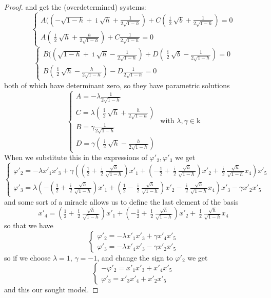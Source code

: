 \documentclass[10pt,reqno]{amsart}
\newcommand{\ii}{\operatorname{i}}
\newcommand{\g}{\gamma}
\newcommand{\f}{\varphi}
\renewcommand{\l}{\lambda}
\newcommand{\kk}{\mathrm{k}}
\theoremstyle{definition}
\begin{document}
\begin{proof}
 and get the (overdetermined) systems:
\[
\begin{cases}
    A((-\sqrt{1-h} + \ii \sqrt{h} + \tfrac{1}{2 \sqrt{1-h}})+ C ( \tfrac{\ii}{2} \sqrt{b} + \tfrac{1}{2 \sqrt{1-h}}) =0 \\
    A (\tfrac{\ii}{2} \sqrt{h} + \tfrac{h}{2 \sqrt{1-h}}) + C \tfrac{1}{2 \sqrt{1-h}} = 0
\end{cases}
\]
\[
\begin{cases}
    B((\sqrt{1-h} + \ii \sqrt{h} - \tfrac{1}{2 \sqrt{1-h}})+ D (\tfrac{\ii}{2} \sqrt{b} - \tfrac{1}{2 \sqrt{1-h}}) =0 \\
    B (\tfrac{\ii}{2} \sqrt{h} - \tfrac{h}{2 \sqrt{1-h}}) - D \tfrac{1}{2 \sqrt{1-h}} = 0
\end{cases}
\]
both of which have determinant zero, so they have parametric solutions
\[
\begin{cases}
    A=-\l \frac{1}{2\sqrt{1-h}}  \\
    C= \l (\frac{\ii}{2} \sqrt{h} +\frac{h}
    {2 \sqrt{1-h}}) \\
    B= \g \frac{1}{2 \sqrt{1-h}} \\
    D= \g (\frac{\ii}{2} \sqrt{h} - \frac{h}{2 \sqrt{1-h}})
\end{cases}
\text{ with } \l , \g \in \kk
\]
When we substitute this in the expressions of $\f'_2, \f'_3$ we get
\[
\begin{cases}
    \f'_2= - \l x'_1 x'_3 + \g \left( (\frac{1}{2} +\frac{\ii}{2} \frac{\sqrt{h}}{\sqrt{1-h}})x'_1 + (-\frac{1}{2} +\frac{\ii}{2} \frac{\sqrt{h}}{\sqrt{1-h}})x'_2 + \frac{\ii}{2} \frac{\sqrt{h}}{\sqrt{1-h}} x_4 \right) x'_5 \\
    \f'_3=\l \left( -(\frac{1}{2} +\frac{\ii}{2} \frac{\sqrt{h}}{\sqrt{1-h}})x'_1 + (\frac{1}{2} -\frac{\ii}{2} \frac{\sqrt{h}}{\sqrt{1-h}})x'_2 - \frac{\ii}{2} \frac{\sqrt{h}}{\sqrt{1-h}} x_4 \right) x'_3 - \g x'_2x'_5  
\end{cases}
\]
and some sort of a miracle allows us to define the last element of the basis
\[
x'_4=(\tfrac{1}{2} +\tfrac{\ii}{2} \tfrac{\sqrt{h}}{\sqrt{1-h}})x'_1 + (-\tfrac{1}{2} +\tfrac{\ii}{2} \tfrac{\sqrt{h}}{\sqrt{1-h}})x'_2 + \tfrac{\ii}{2} \tfrac{\sqrt{h}}{\sqrt{1-h}} x_4
\]
so that we have
\[
\begin{cases}
    \f'_2= - \l x'_1 x'_3 + \g x'_4 x'_5 \\
    \f'_3=-\l x'_4 x'_3 - \g x'_2x'_5  
\end{cases}
\]
so if we choose $\l=1$, $\g=-1$, and change the sign to $\f'_2$ we get
\[
\begin{cases}
    -\f'_2= x'_1 x'_3 + x'_4 x'_5 \\
    \f'_3= x'_3 x'_4 + x'_2x'_5  
\end{cases}
\]
and this our sought model.
\end{proof}
\end{document}
